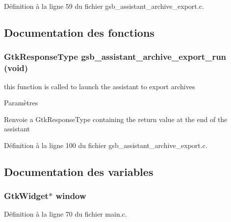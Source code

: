 Définition à la ligne 59 du fichier gsb\_\-assistant\_\-archive\_\-export.c.



\subsection{Documentation des fonctions}
\subsubsection[{gsb\_\-assistant\_\-archive\_\-export\_\-run}]{\setlength{\rightskip}{0pt plus 5cm}GtkResponseType gsb\_\-assistant\_\-archive\_\-export\_\-run (void)}\label{gsb__assistant__archive__export_8c_a40ac4dec2f544da685d1013e9d3d84bb}
this function is called to launch the assistant to export archives


\begin{DoxyParams}{Paramètres}
\item[{\em }]\end{DoxyParams}
\begin{DoxyReturn}{Renvoie}
a GtkResponseType containing the return value at the end of the assistant 
\end{DoxyReturn}


Définition à la ligne 100 du fichier gsb\_\-assistant\_\-archive\_\-export.c.



\subsection{Documentation des variables}
\subsubsection[{window}]{\setlength{\rightskip}{0pt plus 5cm}GtkWidget$\ast$ {\bf window}}\label{gsb__assistant__archive__export_8c_a3d346c08cf2d67c388caabffb412b293}


Définition à la ligne 70 du fichier main.c.


